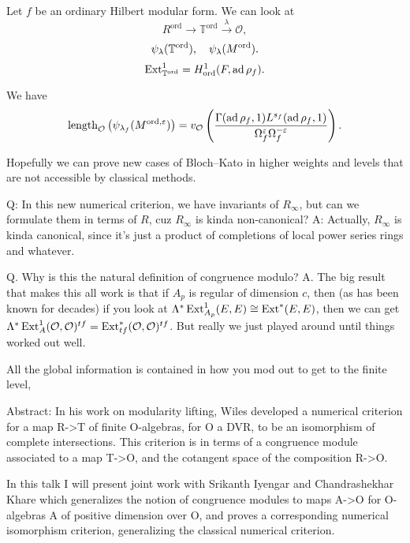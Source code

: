 \documentclass[reqno]{amsart} 
\begin{document}
Let $f$ be an ordinary Hilbert modular form.  We can look at
\begin{equation*}
  R^{\mathrm{ord}} \rightarrow \mathbb{T}^{\mathrm{ord}} \xrightarrow{\lambda} \mathcal{O},
\end{equation*}
\begin{equation*}
  \psi_\lambda(\mathbb{T}^{\operatorname{ord}}), \quad
  \psi_\lambda(M^{\operatorname{ord}}).
\end{equation*}
\begin{equation*}
  \operatorname{Ext}^1_{\mathbb{T}^{\operatorname{ord}}} = H^1_{\operatorname{ord}}(F, \operatorname{ad} \rho_f).
\end{equation*}

\begin{theorem}
  We have
  \begin{equation*}
    \operatorname{length}_{\mathcal{O}} \left( \psi_{\lambda_f}(M^{\operatorname{ord}, \varepsilon}) \right)
    = v_{\mathcal{O}}
    \left(
      \frac{\Gamma(\operatorname{ad} \rho_f, 1) L^{s_f}(\operatorname{ad} \rho_f, 1)}{\Omega_f^{\varepsilon} \Omega_f^{- \varepsilon}}
    \right).
  \end{equation*}
\end{theorem}
Hopefully we can prove new cases of Bloch--Kato in higher weights and levels that are not accessible by classical methods.

Q: In this new numerical criterion, we have invariants of $R_\infty$, but can we formulate them in terms of $R$, cuz $R_\infty$ is kinda non-canonical?  A: Actually, $R_\infty$ is kinda canonical, since it's just a product of completions of local power series rings and whatever.

Q. Why is this the natural definition of congruence modulo?  A.  The big result that makes this all work is that if $A_p$ is regular of dimension $c$, then (as has been known for decades) if you look at $\Lambda^\ast \operatorname{Ext}^1_{A_p}(E, E) \cong \operatorname{Ext}^\ast(E, E)$, then we can get $\Lambda^\ast \operatorname{Ext}_A^1(\mathcal{O}, \mathcal{O})^{t f} = \operatorname{Ext}_{tf}^\ast(\mathcal{O}, \mathcal{O})^{t f}$.  But really we just played around until things worked out well.

All the global information is contained in how you mod out to get to the finite level,

Abstract: In his work on modularity lifting, Wiles developed a numerical criterion for a map R->T of finite
O-algebras, for O a DVR, to be an isomorphism of complete intersections. This criterion is in terms of a
congruence module associated to a map T->O, and the cotangent space of the composition R->O.

In this talk I will present joint work with Srikanth Iyengar and Chandrashekhar Khare which generalizes the
notion of congruence modules to maps A->O for O-algebras A of positive dimension over O, and proves a
corresponding numerical isomorphism criterion, generalizing the classical numerical criterion.
\end{document}
